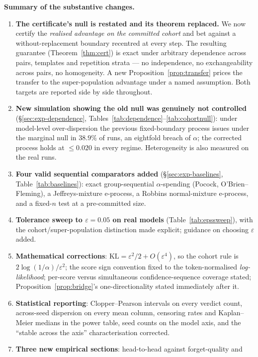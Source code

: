 \documentclass[11pt,a4paper]{article}
\newcommand{\eps}{\varepsilon}
\begin{document}
\medskip
\noindent\textbf{Summary of the substantive changes.}
\begin{enumerate}[leftmargin=1.4em,itemsep=1pt,topsep=2pt]
\item \textbf{The certificate's null is restated and its theorem replaced.} We now
certify the \emph{realised advantage on the committed cohort} and bet against a
without-replacement boundary recentred at every step. The resulting guarantee
(Theorem~\ref{thm:cert}) is exact under arbitrary dependence across pairs, templates and repetition
strata --- no independence, no exchangeability across pairs, no homogeneity. A new
Proposition~\ref{prop:transfer} prices the transfer to the super-population advantage under a named
assumption. Both targets are reported side by side throughout.
\item \textbf{New simulation showing the old null was genuinely not controlled}
(\S\ref{sec:exp-dependence}, Tables~\ref{tab:dependence}--\ref{tab:cohortnull}): under model-level over-dispersion the previous fixed-boundary
process issues under the marginal null in $38.9\%$ of runs, an eightfold breach of
$\alpha$; the corrected process holds at $\le 0.020$ in every regime. Heterogeneity is
also measured on the real runs.
\item \textbf{Four valid sequential comparators added} (\S\ref{sec:exp-baselines}, Table~\ref{tab:baselines}): exact
group-sequential $\alpha$-spending (Pocock, O'Brien--Fleming), a Jeffreys-mixture
e-process, a Robbins normal-mixture e-process, and a fixed-$n$ test at a pre-committed
size.
\item \textbf{Tolerance sweep to $\eps = 0.05$ on real models} (Table~\ref{tab:epssweep}), with the
cohort/super-population distinction made explicit; guidance on choosing $\eps$ added.
\item \textbf{Mathematical corrections}: $\mathrm{KL} = \eps^2/2 + O(\eps^4)$, so the
cohort rule is $2\log(1/\alpha)/\eps^2$; the score sign convention fixed to the
token-normalised \emph{log-likelihood}; per-score versus simultaneous confidence-sequence
coverage stated; Proposition~\ref{prop:bridge}'s one-directionality stated immediately after it.
\item \textbf{Statistical reporting}: Clopper--Pearson intervals on every verdict count,
across-seed dispersion on every mean column, censoring rates and Kaplan--Meier medians
in the power table, seed counts on the model axis, and the ``stable across the axis''
characterisation corrected.
\item \textbf{Three new empirical sections}: head-to-head against forget-quality and

\end{enumerate}
\end{document}

